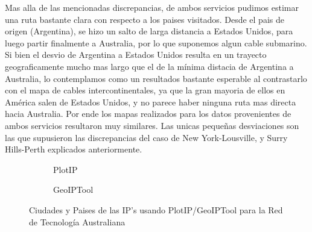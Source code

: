 Mas alla de las mencionadas discrepancias, de ambos servicios pudimos estimar una ruta bastante clara con respecto a los paises visitados. Desde el pais de origen (Argentina), se hizo un salto de larga distancia a Estados Unidos, para luego partir finalmente a Australia, por lo que suponemos algun cable submarino. Si bien el desvio de Argentina a Estados Unidos resulta en un trayecto geograficamente mucho mas largo que el de la mínima distacia de Argentina a Australia, lo contemplamos como un resultados bastante esperable al contrastarlo con el mapa de cables intercontinentales, ya que la gran mayoria de ellos en América salen de Estados Unidos, y no parece haber ninguna ruta mas directa hacia Australia. Por ende los mapas realizados para los datos provenientes de ambos servicios resultaron muy similares. Las unicas pequeñas desviaciones son las que supusieron las discrepancias del caso de New York-Lousville, y Surry Hills-Perth explicados anteriormente.

\begin{figure}[ht]
	\begin{subfigure}[b]{0.5\textwidth}
		\centering
		
		\caption{PlotIP}
	\end{subfigure}
	\begin{subfigure}[b]{0.5\textwidth}
		\centering
		
		\caption{GeoIPTool}
	\end{subfigure}
	\caption{Ciudades y Paises de las IP's usando PlotIP/GeoIPTool para la Red de Tecnología Australiana}
	\label{fig:lugares_australia}
\end{figure}

